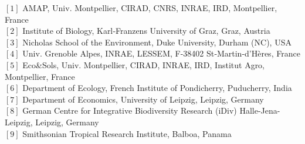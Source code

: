 {\small
  \begin{flushleft}
    $[1]$ AMAP, Univ. Montpellier, CIRAD, CNRS, INRAE, IRD, Montpellier, France\\
    $[2]$ Institute of Biology, Karl‐Franzens University of Graz, Graz, Austria\\
    $[3]$ Nicholas School of the Environment, Duke University, Durham (NC), USA\\
    $[4]$ Univ. Grenoble Alpes, INRAE, LESSEM, F-38402 St‐Martin‐d'Hères, France\\
    $[5]$ Eco\&Sols, Univ. Montpellier, CIRAD, INRAE, IRD, Institut Agro, Montpellier, France\\
    $[6]$ Department of Ecology, French Institute of Pondicherry, Puducherry, India\\
    $[7]$ Department of Economics, University of Leipzig, Leipzig, Germany\\
    $[8]$ German Centre for Integrative Biodiversity Research (iDiv) Halle-Jena-Leipzig, Leipzig, Germany\\
    $[9]$ Smithsonian Tropical Research Institute, Balboa, Panama\\
  \end{flushleft}}

\newpage